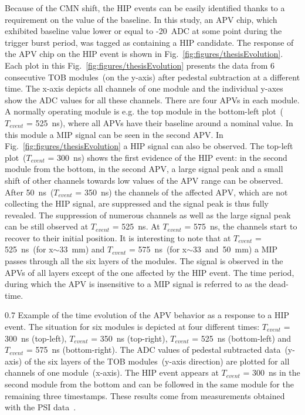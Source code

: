 Because of the CMN shift, the HIP events can be easily identified thanks to a requirement on the value of the baseline. In this study, an APV chip, which exhibited baseline value lower or equal to -20~ADC at some point during the trigger burst period, was tagged as containing a  HIP candidate. The response of the APV chip on the HIP event is shown in Fig.~\ref{fig:figures/thesisEvolution}. Each plot in this Fig.~\ref{fig:figures/thesisEvolution} presents the data from 6 consecutive TOB modules~(on the y-axis) after pedestal subtraction at a different time. The x-axis depicts all channels of one module and the individual y-axes show the ADC values for all these channels. There are four APVs in each module. A normally operating module is e.g. the top module in the bottom-left plot~($T_{event}$ = 525~ns), where all APVs have their baseline around a nominal value. In this module a MIP signal can be seen in the second APV. In Fig.~\ref{fig:figures/thesisEvolution} a HIP signal can also be observed. The top-left plot~($T_{event}$ = 300~ns) shows the first evidence of the HIP event: in the second module from the bottom, in the second APV, a large signal peak and a small shift of other channels towards low values of the APV range can be observed. After 50~ns~($T_{event}$ = 350~ns) the channels of the affected APV, which are not collecting the HIP signal, are suppressed and the signal peak is thus fully revealed. The suppression of numerous channels as well as the large signal peak can be still observed at $T_{event}$ = 525~ns. At $T_{event}$ = 575~ns, the channels start to recover to their initial position. It is interesting to note that at $T_{event}$ = 525~ns~(for x$\sim$33~mm) and $T_{event}$ = 575~ns~(for x$\sim$33~and~50~mm) a MIP passes through all the six layers of the modules. The signal is observed in the APVs of all layers except of the one affected by the HIP event. The time period, during which the APV is insensitive to a MIP signal is referred to as the dead-time.

                 {0.7}       %
                 {Example of the time evolution of the APV behavior as a response to a HIP event. The situation for six modules is depicted at four different times:  $T_{event}$ = 300~ns (top-left), $T_{event}$ = 350~ns (top-right), $T_{event}$ = 525~ns (bottom-left) and $T_{event}$ = 575~ns (bottom-right). The ADC values of pedestal subtracted data~(y-axis) of the six layers of the TOB modules~(y-axis direction) are plotted for all channels of one module~(x-axis). The HIP event appears at $T_{event}$ = 300~ns in the second module from the bottom and can be followed in the same module for the remaining three timestamps. These results come from measurements obtained with the PSI data~\cite{Bainbridge:2004jc}.} %

